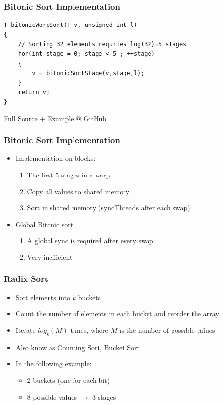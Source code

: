 \documentclass[aspectratio=169,handout]{beamer}
\begin{document}
\begin{frame}[fragile]
\frametitle{Bitonic Sort Implementation}
\begin{lstlisting}
T bitonicWarpSort(T v, unsigned int l)
{
	// Sorting 32 elements requries log(32)=5 stages
	for(int stage = 0; stage < 5 ; ++stage)
	{
		v = bitonicSortStage(v,stage,l);
	}
	return v;
}
\end{lstlisting}
\href{https://github.com/darglein/saiga/blob/master/samples/cuda/bitonicSort/main.cu}{Full Source + Example @ GitHub}
\end{frame}

\frame
{
	\frametitle{Bitonic Sort Implementation}
\begin{itemize}
	\item Implementation on blocks:
	\begin{enumerate}
		\item The first 5 stages in a warp 
		\item<2-> Copy all values to shared memory
		\item<2-> Sort in shared memory (syncThreads after each swap)
	\end{enumerate}
\item Global Bitonic sort
\begin{enumerate}
	\item A global sync is required after every swap
	\item<4->[$\rightarrow$] Very inefficient
\end{enumerate}
\end{itemize}
}

\frame
{
	\frametitle{Radix Sort}
	\begin{itemize}
		\item<2-> Sort elements into $k$ buckets
		\item<3-> Count the number of elements in each bucket and reorder the array
		\item<4-> Iterate $log_k(M)$ times, where $M$ is the number of possible values
		\item<5-> Also know as Counting Sort, Bucket Sort
		\item<6-> In the following example:
\begin{itemize}
	\item<6-> 2 buckets (one for each bit)
	\item<6-> 8 possible values $\rightarrow$ 3 stages
\end{itemize}
	\end{itemize}
}
\end{document}
